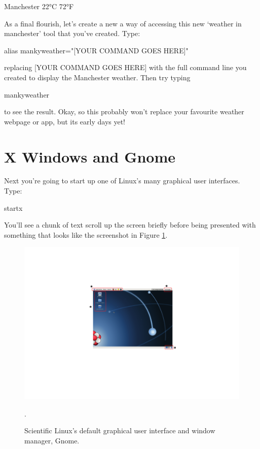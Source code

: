 \begin{ttoutenv}
   [33]Manchester 22°C 72°F
\end{ttoutenv}

As a final flourish, let's create a new a way of accessing this new `weather in manchester' tool that you've created. Type:

\begin{ttoutenv}
alias mankyweather="[YOUR COMMAND GOES HERE]"
\end{ttoutenv}

replacing [YOUR COMMAND GOES HERE] with the full command line you created to display the Manchester weather. Then try typing

\begin{ttoutenv}
mankyweather
\end{ttoutenv}

to see the result. Okay, so this probably won't replace your favourite weather webpage or app, but its early days yet! 


\section{X Windows and Gnome} 

Next you're going to start up one of Linux's many graphical user interfaces. Type:

\begin{ttoutenv}
startx
\end{ttoutenv}

You'll see a chunk of text scroll up the screen briefly before being presented with something that looks like the screenshot in Figure \ref{figure:gnome-desktop}.

\begin{figure}[t]
\centerline{\includegraphics[width=15cm]{images/gnome-desktop}}
\caption{Scientific Linux's default graphical user interface and window manager, Gnome.}\label{figure:gnome-desktop}.
\end{figure}

